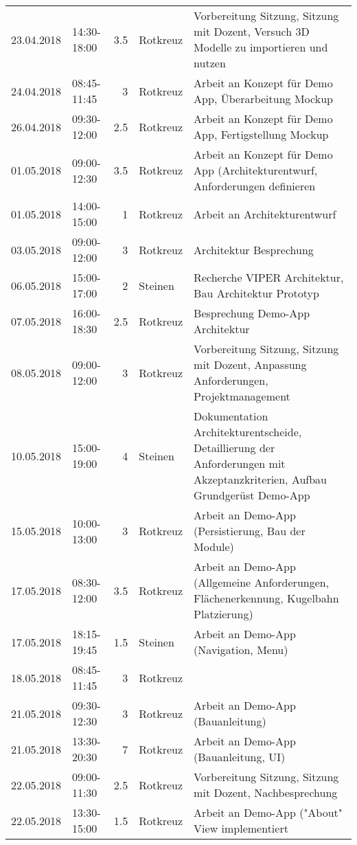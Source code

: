 \begin{longtable}{llrlp{7cm}}
	23.04.2018 & 14:30-18:00 & 3.5    & Rotkreuz & Vorbereitung Sitzung, Sitzung mit Dozent, Versuch 3D Modelle zu importieren und nutzen \\
	24.04.2018 & 08:45-11:45 & 3      & Rotkreuz & Arbeit an Konzept für Demo App, Überarbeitung Mockup \\
	26.04.2018 & 09:30-12:00 & 2.5    & Rotkreuz & Arbeit an Konzept für Demo App, Fertigstellung Mockup \\
	01.05.2018 & 09:00-12:30 & 3.5    & Rotkreuz & Arbeit an Konzept für Demo App (Architekturentwurf, Anforderungen definieren \\
	01.05.2018 & 14:00-15:00 & 1      & Rotkreuz & Arbeit an Architekturentwurf \\
	03.05.2018 & 09:00-12:00 & 3      & Rotkreuz & Architektur Besprechung \\
	06.05.2018 & 15:00-17:00 & 2      & Steinen & Recherche VIPER Architektur, Bau Architektur Prototyp \\
	07.05.2018 & 16:00-18:30 & 2.5    & Rotkreuz & Besprechung Demo-App Architektur \\
	08.05.2018 & 09:00-12:00 & 3      & Rotkreuz & Vorbereitung Sitzung, Sitzung mit Dozent, Anpassung Anforderungen, Projektmanagement \\
	10.05.2018 & 15:00-19:00 & 4      & Steinen & Dokumentation Architekturentscheide, Detaillierung der Anforderungen mit Akzeptanzkriterien, Aufbau Grundgerüst Demo-App \\
	15.05.2018 & 10:00-13:00 & 3      & Rotkreuz & Arbeit an Demo-App (Persistierung, Bau der Module) \\
	17.05.2018 & 08:30-12:00 & 3.5    & Rotkreuz & Arbeit an Demo-App (Allgemeine Anforderungen, Flächenerkennung, Kugelbahn Platzierung) \\
	17.05.2018 & 18:15-19:45 & 1.5    & Steinen & Arbeit an Demo-App (Navigation, Menu) \\
	18.05.2018 & 08:45-11:45 & 3      & Rotkreuz \\
	21.05.2018 & 09:30-12:30 & 3      & Rotkreuz & Arbeit an Demo-App (Bauanleitung) \\
	21.05.2018 & 13:30-20:30 & 7      & Rotkreuz & Arbeit an Demo-App (Bauanleitung, UI) \\
	22.05.2018 & 09:00-11:30 & 2.5    & Rotkreuz & Vorbereitung Sitzung, Sitzung mit Dozent, Nachbesprechung \\
	22.05.2018 & 13:30-15:00 & 1.5    & Rotkreuz & Arbeit an Demo-App ("About" View implementiert \\

\end{longtable}
